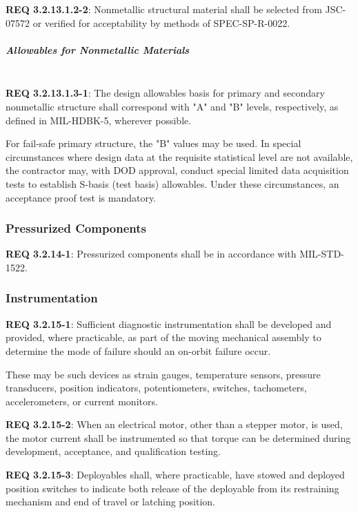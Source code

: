 \documentclass[12pt]{article}
\begin{document}
\noindent \textbf{REQ 3.2.13.1.2-2}: Nonmetallic structural material shall be selected from JSC-07572 or verified for acceptability by methods of SPEC-SP-R-0022.


\subparagraph{Allowables for Nonmetallic Materials} \mbox{} \\ %
\noindent \textbf{REQ 3.2.13.1.3-1}: The design allowables basis for primary and secondary nonmetallic structure shall correspond with "A" and "B" levels, respectively, as defined in MIL-HDBK-5, wherever possible. 

For fail-safe primary structure, the "B" values may be used. 
In special circumstances where design data at the requisite statistical level are not available, the contractor may, with DOD approval, conduct special limited data acquisition tests to establish S-basis (test basis) allowables. 
Under these circumstances, an acceptance proof test is mandatory.


\clearpage
\subsubsection{Pressurized Components} %
\noindent \textbf{REQ 3.2.14-1}: Pressurized components shall be in accordance with MIL-STD-1522.


\subsubsection{Instrumentation} %
\noindent \textbf{REQ 3.2.15-1}: Sufficient diagnostic instrumentation shall be developed and provided, where practicable, as part of the moving mechanical assembly to determine the mode of failure should an on-orbit failure occur.

These may be such devices as strain gauges, temperature sensors, pressure transducers, position indicators, potentiometers, switches, tachometers, accelerometers, or current monitors.

\noindent \textbf{REQ 3.2.15-2}: When an electrical motor, other than a stepper motor, is used, the motor current shall be instrumented so that torque can be determined during development, acceptance, and qualification testing. 

\noindent \textbf{REQ 3.2.15-3}: Deployables shall, where practicable, have stowed and deployed position switches to indicate both release of the deployable from its restraining mechanism and end of travel or latching position. 
\end{document}
